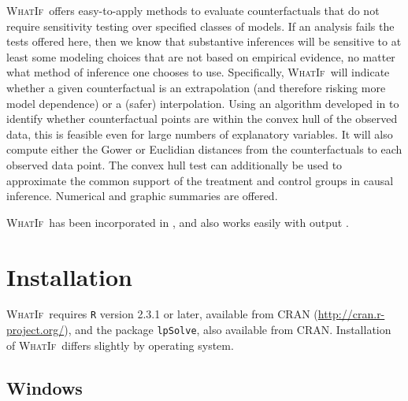 \documentclass[oneside,letterpaper,titlepage]{article}
\newcommand{\hlink}{\htmladdnormallink}
\newcommand{\WhatIf}{\textsc{WhatIf}}
\begin{document}
\WhatIf\ offers easy-to-apply methods to evaluate counterfactuals that
do not require sensitivity testing over specified classes of models.
If an analysis fails the tests offered here, then we know that
substantive inferences will be sensitive to at least some modeling
choices that are not based on empirical evidence, no matter what
method of inference one chooses to use.  Specifically, \WhatIf\ will
indicate whether a given counterfactual is an extrapolation (and
therefore risking more model dependence) or a (safer) interpolation.
Using an algorithm developed in \citet{KinZen06} to identify whether
counterfactual points are within the convex hull of the observed data,
this is feasible even for large numbers of explanatory variables.  It
will also compute either the Gower or Euclidian distances from the
counterfactuals to each observed data point.  The convex hull test can
additionally be used to approximate the common support of the
treatment and control groups in causal inference.  Numerical and
graphic summaries are offered.

\WhatIf\ has been incorporated in \hlink{MatchIt}{/matchit}, and also
works easily with \hlink{Zelig}{/zelig} output
\citep{HoImaKin07,ImaKinLau06,ImaKinLau07}.

\section{Installation}

\WhatIf\ requires \texttt{R} version 2.3.1 or later, available from
CRAN (\url{http://cran.r-project.org/}), and the package
\texttt{lpSolve}, also available from CRAN.  Installation of \WhatIf\ 
differs slightly by operating system.

\subsection{Windows}
\end{document}
